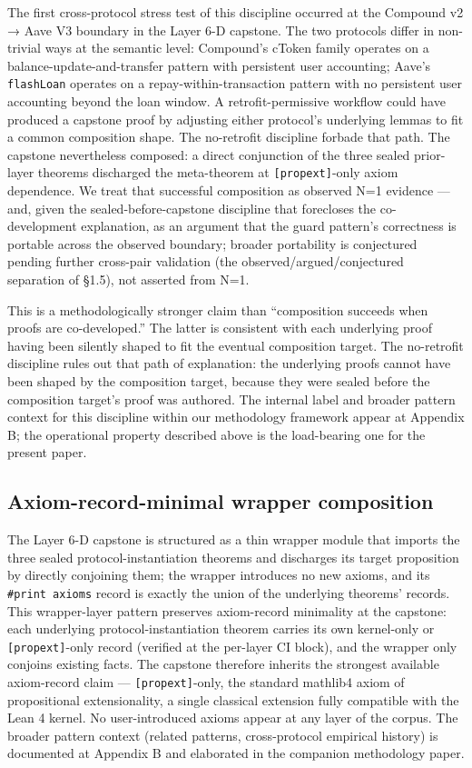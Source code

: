 The first cross-protocol stress test of this discipline occurred at the
Compound v2 → Aave V3 boundary in the Layer 6-D capstone. The two
protocols differ in non-trivial ways at the semantic level: Compound's
cToken family operates on a balance-update-and-transfer pattern with
persistent user accounting; Aave's \texttt{flashLoan} operates on a
repay-within-transaction pattern with no persistent user accounting
beyond the loan window. A retrofit-permissive workflow could have
produced a capstone proof by adjusting either protocol's underlying
lemmas to fit a common composition shape. The no-retrofit discipline
forbade that path. The capstone nevertheless composed: a direct
conjunction of the three sealed prior-layer theorems discharged the
meta-theorem at \texttt{{[}propext{]}}-only axiom dependence. We treat
that successful composition as observed N=1 evidence --- and, given the
sealed-before-capstone discipline that forecloses the co-development
explanation, as an argument that the guard pattern's correctness is
portable across the observed boundary; broader portability is
conjectured pending further cross-pair validation (the
observed/argued/conjectured separation of §1.5), not asserted from N=1.

This is a methodologically stronger claim than ``composition succeeds
when proofs are co-developed.'' The latter is consistent with each
underlying proof having been silently shaped to fit the eventual
composition target. The no-retrofit discipline rules out that path of
explanation: the underlying proofs cannot have been shaped by the
composition target, because they were sealed before the composition
target's proof was authored. The internal label and broader pattern
context for this discipline within our methodology framework appear at
Appendix B; the operational property described above is the load-bearing
one for the present paper.

\subsection{Axiom-record-minimal wrapper
composition}\label{axiom-record-minimal-wrapper-composition}

The Layer 6-D capstone is structured as a thin wrapper module that
imports the three sealed protocol-instantiation theorems and discharges
its target proposition by directly conjoining them; the wrapper
introduces no new axioms, and its \texttt{\#print\ axioms} record is
exactly the union of the underlying theorems' records. This
wrapper-layer pattern preserves axiom-record minimality at the capstone:
each underlying protocol-instantiation theorem carries its own
kernel-only or \texttt{{[}propext{]}}-only record (verified at the
per-layer CI block), and the wrapper only conjoins existing facts. The
capstone therefore inherits the strongest available axiom-record claim
--- \texttt{{[}propext{]}}-only, the standard mathlib4 axiom of
propositional extensionality, a single classical extension fully
compatible with the Lean 4 kernel. No user-introduced axioms appear at
any layer of the corpus. The broader pattern context (related patterns,
cross-protocol empirical history) is documented at Appendix B and
elaborated in the companion methodology paper.

